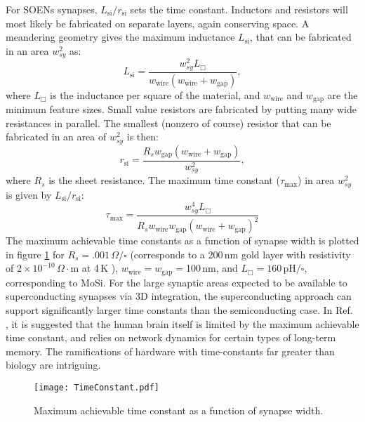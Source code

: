 \documentclass[twocolumn]{article}
\newcommand{\onlinecite}[1]{\hspace{-1 ex} \nocite{#1}\citenum{#1}}
\begin{document}
For SOENs synapses, $L_{\mathrm{si}}/r_{\mathrm{si}}$ sets the time constant. Inductors and resistors will most likely be fabricated on separate layers, again conserving space. A meandering geometry gives the maximum inductance $L_{\mathrm{si}}$, that can be fabricated in an area $w_{sy}^2$ as:
\begin{equation}
    L_{\mathrm{si}} = \frac{w_{sy}^2L_{\Box}}{w_{\mathrm{wire}}(w_{\mathrm{wire}} + w_{\mathrm{gap}})},
\end{equation}
where $L_{\Box}$ is the inductance per square of the material, and $w_{\mathrm{wire}}$ and $w_{\mathrm{gap}}$ are the minimum feature sizes. Small value resistors are fabricated by putting many wide resistances in parallel. The smallest (nonzero of course) resistor that can be fabricated in an area of $w_{sy}^2$ is then:
\begin{equation}
    r_{\mathrm{si}} = \frac{R_sw_{\mathrm{gap}}(w_{\mathrm{wire}} + w_{\mathrm{gap}})}{w_{sy}^2},
\end{equation}
where $R_s$ is the sheet resistance. The maximum time constant ($\tau_{\mathrm{max}}$) in area $w_{sy}^2$ is given by $L_{\mathrm{si}}/r_{\mathrm{si}}$:
\begin{equation}
    \tau_{\mathrm{max}} = \frac{w_{sy}^4L_{\Box}}{R_sw_{\mathrm{wire}}w_{\mathrm{gap}}(w_{\mathrm{wire}}+w_{\mathrm{gap}})^2}
\end{equation}
The maximum achievable time constants as a function of synapse width is plotted in figure \ref{fig:timecon} for $R_s = .001$\,$\Omega/\square$ (corresponds to a 200\,nm gold layer with resistivity of $2\times 10^{-10}\,\Omega\cdot$m at 4\,K \cite{matula1979electrical}), $w_{\mathrm{wire}} = w_{\mathrm{gap}} = $100\,nm, and $L_{\Box} = 160$\,pH$/\square$, corresponding to MoSi. For the large synaptic areas expected to be available to superconducting synapses via 3D integration, the superconducting approach can support significantly larger time constants than the semiconducting case. In Ref.\,\onlinecite{indiveri2019importance}, it is suggested that the human brain itself is limited by the maximum achievable time constant, and relies on network dynamics for certain types of long-term memory. The ramifications of hardware with time-constants far greater than biology are intriguing. 
\begin{figure}[!h]
    \centering
    \texttt{[image: TimeConstant.pdf]}
    \caption{Maximum achievable time constant as a function of synapse width.}
    \label{fig:timecon}
\end{figure}
\end{document}
